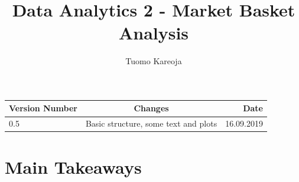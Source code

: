 \documentclass[12pt,a4paper,leqno]{report}
\title{Data Analytics 2 - Market Basket Analysis}
\author{Tuomo Kareoja}
\date{}
\theoremstyle{plain}
\theoremstyle{definition}
\theoremstyle{remark}
\begin{document}
\maketitle

\begin{table}[h!]
  \begin{center}
    \begin{tabular}{l|c|r}
      \textbf{Version Number} & \textbf{Changes} & \textbf{Date} \\
      \hline
      0.5 & Basic structure, some text and plots & 16.09.2019\\
    \end{tabular}
  \end{center}
\end{table}

\newpage

\section{Main Takeaways}
\end{document}
